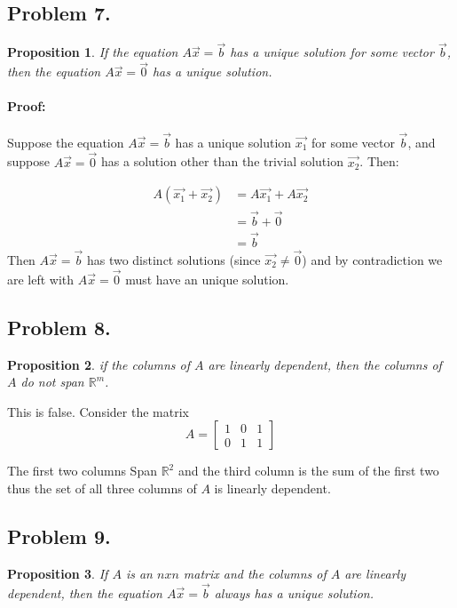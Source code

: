 \documentclass[12pt, letterpaper]{article}
\newcommand{\R}{\mathbb{R}}
\theoremstyle{statement}
\newtheorem*{atmProp}{Proposition}
\newenvironment{atmProof}{\noindent\ignorespaces\paragraph{Proof:}}{\hfill \ding{122}\par\noindent}
\begin{document}
    \subsection*{Problem 7.}
    \begin{atmProp}
    If the equation $A\vec{x}=\vec{b}$ has a unique solution for some vector $\vec{b}$, then the equation $A\vec{x}=\vec{0}$ has a unique solution. 
    \end{atmProp}
    \begin{atmProof}
    Suppose the equation $A\vec{x}=\vec{b}$ has a unique solution $\vec{x_1}$ for some vector $\vec{b}$, and suppose $A\vec{x}=\vec{0}$ has a solution other than the trivial solution $\vec{x_2}$. Then:
    
    \begin{align*}
        A(\vec{x_1} + \vec{x_2}) & = A\vec{x_1} + A\vec{x_2}\\
        & = \vec{b} + \vec{0}\\
        & = \vec{b}
    \end{align*}
    Then $A\vec{x}=\vec{b}$ has two distinct solutions (since $\vec{x_2} \neq \vec{0}$) and by contradiction we are left with $A\vec{x}=\vec{0}$ must have an unique solution.
    \end{atmProof}
    
    \subsection*{Problem 8.}
    \begin{atmProp}
    if the columns of $A$ are linearly dependent, then the columns of $A$ do not span $\R^m$.
    \end{atmProp}
    
    This is false. Consider the matrix $$A=\begin{bmatrix} 1 & 0 & 1 \\ 
    0 & 1 & 1\end{bmatrix}$$
    
    The first two columns Span $\R^2$ and the third column is the sum of the first two thus the set of all three columns of $A$ is linearly dependent.
    
    \subsection*{Problem 9.}
    \begin{atmProp}
    If $A$ is an $n x n$ matrix and the columns of $A$ are linearly dependent, then the equation $A\vec{x}=\vec{b}$ always has a unique solution. 
    \end{atmProp}
    
\end{document}
